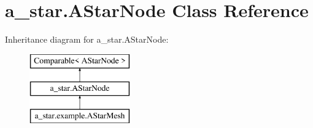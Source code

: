 \hypertarget{classa__star_1_1_a_star_node}{\section{a\-\_\-star.\-A\-Star\-Node Class Reference}
\label{classa__star_1_1_a_star_node}
}
Inheritance diagram for a\-\_\-star.\-A\-Star\-Node\-:\begin{figure}[H]
\begin{center}
\leavevmode
\includegraphics[height=3.000000cm]{classa__star_1_1_a_star_node}
\end{center}
\end{figure}
